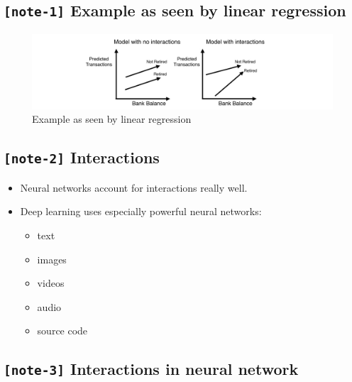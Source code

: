 \documentclass[11pt, twoside]{article}
\begin{document}
    \hypertarget{note-1-example-as-seen-by-linear-regression}{%
\subsection{\texorpdfstring{\texttt{{[}note-1{]}} Example as seen by
linear
regression}{{[}note-1{]} Example as seen by linear regression}}\label{note-1-example-as-seen-by-linear-regression}}

\begin{figure}
\centering
\includegraphics{../Figures/1. Example as seen by linear regression.jpg}
\caption{Example as seen by linear regression}
\end{figure}

    \hypertarget{note-2-interactions}{%
\subsection{\texorpdfstring{\texttt{{[}note-2{]}}
Interactions}{{[}note-2{]} Interactions}}\label{note-2-interactions}}

\begin{itemize}
\item
  Neural networks account for interactions really well.
\item
  Deep learning uses especially powerful neural networks:

  \begin{itemize}
  \item
    text
  \item
    images
  \item
    videos
  \item
    audio
  \item
    source code
  \end{itemize}
\end{itemize}

    \hypertarget{note-3-interactions-in-neural-network}{%
\subsection{\texorpdfstring{\texttt{{[}note-3{]}} Interactions in neural
network}{{[}note-3{]} Interactions in neural network}}\label{note-3-interactions-in-neural-network}}
\end{document}
